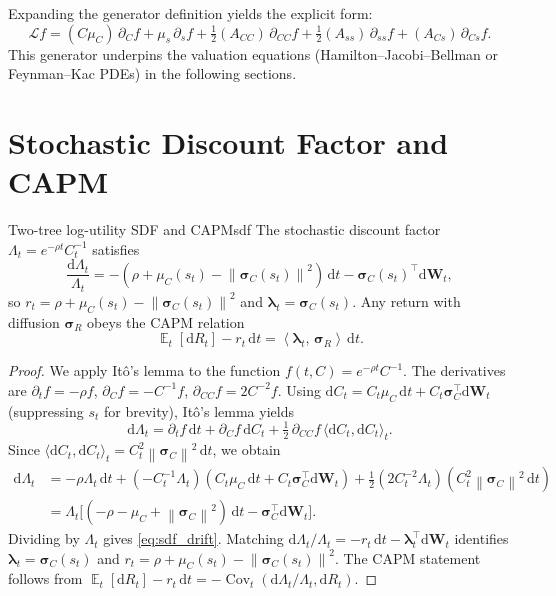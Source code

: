 ﻿\documentclass[11pt,letterpaper,oneside]{article}
\numberwithin{equation}{section}
\DeclareMathOperator{\E}{\mathbb{E}}
\DeclareMathOperator{\Cov}{\mathrm{Cov}}
\newcommand{\1}{\mathbf{1}}
\newcommand{\diff}{\mathrm{d}}
\newcommand{\norm}[1]{\left\lVert #1\right\rVert}
\newcommand{\ip}[2]{\left\langle #1,\,#2\right\rangle}
\begin{document}
Expanding the generator definition yields the explicit form:
\[
  \mathcal{L}f = (C\mu_C) \,\partial_C f + \mu_s \,\partial_s f + \tfrac12 (A_{CC}) \,\partial_{CC} f + \tfrac12 (A_{ss}) \,\partial_{ss} f + (A_{Cs}) \,\partial_{Cs} f.
\]
This generator underpins the valuation equations (Hamilton--Jacobi--Bellman or Feynman--Kac PDEs) in the following sections.

\section{Stochastic Discount Factor and CAPM}\label{sec:sdf}

\begin{proposition}{Two-tree log-utility SDF and CAPM}{sdf}
The stochastic discount factor $\Lambda_t=e^{-\rho t}C_t^{-1}$ satisfies
\begin{equation}\label{eq:sdf_drift}
  \frac{\diff \Lambda_t}{\Lambda_t}=-(\rho+\mu_C(s_t)-\norm{\bm{\sigma}_C(s_t)}^2)\,\diff t-\bm{\sigma}_C(s_t)^{\top}\diff \bm{W}_t,
\end{equation}
so $r_t=\rho+\mu_C(s_t)-\norm{\bm{\sigma}_C(s_t)}^2$ and $\bm{\lambda}_t=\bm{\sigma}_C(s_t)$. Any return with diffusion $\bm{\sigma}_R$ obeys the CAPM relation
\begin{equation}\label{eq:capm}
  \E_t[\diff R_t]-r_t\,\diff t=\ip{\bm{\lambda}_t}{\bm{\sigma}_R}\,\diff t.
\end{equation}
\end{proposition}
\begin{proof}
We apply It\^o's lemma to the function $f(t, C) = e^{-\rho t} C^{-1}$. The derivatives are $\partial_t f = -\rho f$, $\partial_C f = -C^{-1} f$, $\partial_{CC} f = 2C^{-2} f$. Using $\diff C_t = C_t\mu_C\,\diff t + C_t\bm{\sigma}_C^{\top}\diff\bm{W}_t$ (suppressing $s_t$ for brevity), It\^o's lemma yields
\[
  \diff\Lambda_t = \partial_t f\,\diff t + \partial_C f\,\diff C_t + \tfrac12\,\partial_{CC} f\,\langle\diff C_t,\diff C_t\rangle_t.
\]
Since $\langle\diff C_t,\diff C_t\rangle_t = C_t^2\norm{\bm{\sigma}_C}^2\,\diff t$, we obtain
\begin{align*}
  \diff\Lambda_t
  &= -\rho\Lambda_t\,\diff t + (-C_t^{-1}\Lambda_t)(C_t\mu_C\,\diff t + C_t\bm{\sigma}_C^{\top}\diff\bm{W}_t) + \tfrac12(2 C_t^{-2}\Lambda_t)(C_t^2\norm{\bm{\sigma}_C}^2\,\diff t) \\
  &= \Lambda_t\Big[(-\rho-\mu_C+\norm{\bm{\sigma}_C}^2)\,\diff t - \bm{\sigma}_C^{\top}\diff\bm{W}_t\Big].
\end{align*}
Dividing by $\Lambda_t$ gives \cref{eq:sdf_drift}. Matching $\diff\Lambda_t/\Lambda_t = -r_t\,\diff t - \bm{\lambda}_t^{\top}\diff\bm{W}_t$ identifies $\bm{\lambda}_t=\bm{\sigma}_C(s_t)$ and $r_t=\rho+\mu_C(s_t)-\norm{\bm{\sigma}_C(s_t)}^2$. The CAPM statement follows from $\E_t[\diff R_t]-r_t\,\diff t=-\Cov_t(\diff\Lambda_t/\Lambda_t,\diff R_t)$.
\end{proof}
\end{document}
